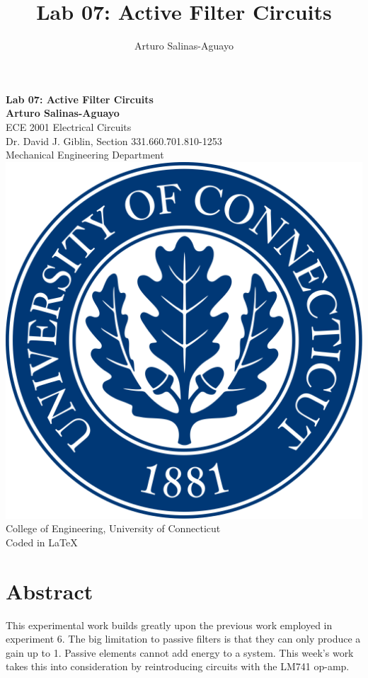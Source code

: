 \documentclass[12pt]{article}
\author{Arturo Salinas-Aguayo}
\title{Lab 07: Active Filter Circuits}
\begin{document}
\newcommand{\closure}[2][3]{%
	{}\mkern#1mu\overline{\mkern-#1mu#2}}
\newcommand\ncoverline[1]{\mkern1mu\overline{\mkern-1mu#1\mkern-1mu}\mkern1mu}
\begin{titlepage}
	\centering
	\vspace*{3cm}
	\huge\textbf{Lab 07: Active Filter Circuits}\\
	
	\vspace{5cm}
	\Large\textbf{Arturo Salinas-Aguayo}\\
	\normalsize
	ECE 2001 Electrical Circuits\\
	Dr. David J. Giblin, Section 331.660.701.810-1253\\
	Mechanical Engineering Department
	\vfill
	\includegraphics[scale=0.1]{uconnlogo}\\
	College of Engineering, University of Connecticut\\
	\scriptsize{Coded in \LaTeX}
	\vspace*{1cm}
\end{titlepage}
\tableofcontents
\newpage

\section{Abstract}
This experimental work builds greatly upon the previous work employed in
experiment 6. The big limitation to passive filters is that they can only
produce a gain up to 1. Passive elements cannot add energy to a system. This
week's work takes this into consideration by reintroducing circuits with the
LM741 op-amp.
\end{document}
